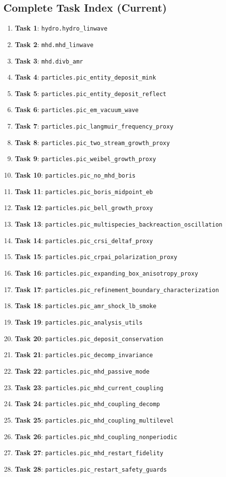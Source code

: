 \documentclass[twocolumn]{aastex701}
\newcommand{\task}[1]{\textbf{Task #1}}
\begin{document}
\subsection{Complete Task Index (Current)}

\begin{enumerate}
\item \task{1}: \texttt{hydro.hydro\_linwave}
\item \task{2}: \texttt{mhd.mhd\_linwave}
\item \task{3}: \texttt{mhd.divb\_amr}
\item \task{4}: \texttt{particles.pic\_entity\_deposit\_mink}
\item \task{5}: \texttt{particles.pic\_entity\_deposit\_reflect}
\item \task{6}: \texttt{particles.pic\_em\_vacuum\_wave}
\item \task{7}: \texttt{particles.pic\_langmuir\_frequency\_proxy}
\item \task{8}: \texttt{particles.pic\_two\_stream\_growth\_proxy}
\item \task{9}: \texttt{particles.pic\_weibel\_growth\_proxy}
\item \task{10}: \texttt{particles.pic\_no\_mhd\_boris}
\item \task{11}: \texttt{particles.pic\_boris\_midpoint\_eb}
\item \task{12}: \texttt{particles.pic\_bell\_growth\_proxy}
\item \task{13}: \texttt{particles.pic\_multispecies\_backreaction\_oscillation}
\item \task{14}: \texttt{particles.pic\_crsi\_deltaf\_proxy}
\item \task{15}: \texttt{particles.pic\_crpai\_polarization\_proxy}
\item \task{16}: \texttt{particles.pic\_expanding\_box\_anisotropy\_proxy}
\item \task{17}: \texttt{particles.pic\_refinement\_boundary\_characterization}
\item \task{18}: \texttt{particles.pic\_amr\_shock\_lb\_smoke}
\item \task{19}: \texttt{particles.pic\_analysis\_utils}
\item \task{20}: \texttt{particles.pic\_deposit\_conservation}
\item \task{21}: \texttt{particles.pic\_decomp\_invariance}
\item \task{22}: \texttt{particles.pic\_mhd\_passive\_mode}
\item \task{23}: \texttt{particles.pic\_mhd\_current\_coupling}
\item \task{24}: \texttt{particles.pic\_mhd\_coupling\_decomp}
\item \task{25}: \texttt{particles.pic\_mhd\_coupling\_multilevel}
\item \task{26}: \texttt{particles.pic\_mhd\_coupling\_nonperiodic}
\item \task{27}: \texttt{particles.pic\_mhd\_restart\_fidelity}
\item \task{28}: \texttt{particles.pic\_restart\_safety\_guards}
\end{enumerate}
\end{document}

